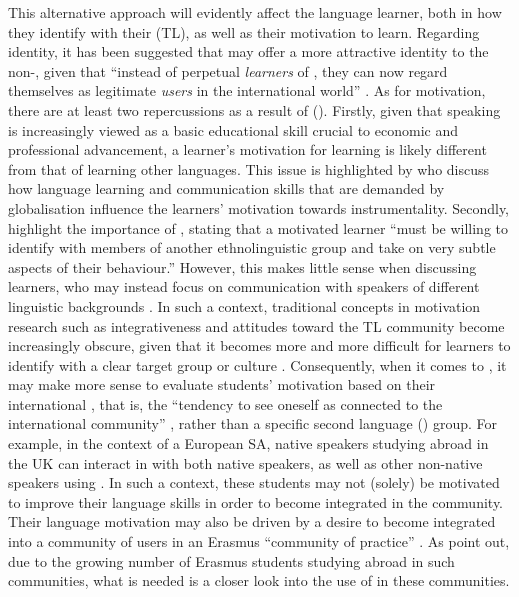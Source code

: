 \documentclass[output=paper]{langsci/langscibook}
\begin{document}
This alternative approach will evidently affect the language learner, both in how they identify with their  (TL), as well as their motivation to learn. Regarding identity, it has been suggested that  may offer a more attractive identity to the non-, given that “instead of perpetual \textit{learners} of , they can now regard themselves as legitimate  \textit{users} in the international world” \citep[2]{Majanen2008}. As for motivation, there are at least two repercussions as a result of  (\citealt{DörnyeiUshioda2013}). Firstly, given that speaking  is increasingly viewed as a basic educational skill crucial to economic and professional advancement, a learner’s motivation for learning  is likely different from that of learning other languages. This issue is highlighted by \citet{BlockCameron2002} who discuss how language learning and communication skills that are demanded by globalisation influence the learners’ motivation towards instrumentality. Secondly, \citet[135]{GardnerLambert1972} highlight the importance of , stating that a motivated learner “must be willing to identify with members of another ethnolinguistic group and take on very subtle aspects of their behaviour.” However, this  makes little sense when discussing  learners, who may instead focus on communication with speakers of different {linguistic} backgrounds \citep{Breiteneder2005}. In such a context, traditional concepts in motivation research such as integrativeness and attitudes toward the \isi TL community become increasingly obscure, given that it becomes more and more difficult for  learners to identify with a clear target group or culture \citep{Yashima2009}. Consequently, when it comes to , it may make more sense to evaluate students’ motivation based on their international , that is, the “tendency to see oneself as connected to the international community” \citep[3]{Yashima2009}, rather than a specific second language () group. For example, in the context of a European SA, native  speakers studying abroad in the UK can interact in  with both native  speakers, as well as other non-native speakers using . In such a context, these students may not (solely) be motivated to improve their language skills in order to become integrated in the  community. Their language motivation may also be driven by a desire to become integrated into a community of  users in an Erasmus “community of practice” \citep{Wenger1998}. As \cite{KaypakOrtaçtepe2014} point out, due to the growing number of Erasmus students studying abroad in such  communities, what is needed is a closer look into the use of  in these communities.
\end{document}
